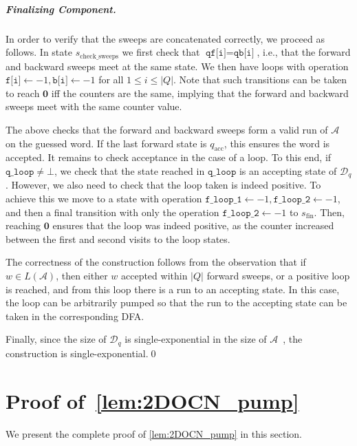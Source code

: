 \documentclass[11pt,a4paper]{amsart}
\theoremstyle{definition}
\newcommand{\accstate}{q_{\mathrm{acc}}}
\renewcommand{\vec}[1]{\boldsymbol{#1}}
\newcommand{\adds}[1]{\leftarrow #1}
\newcommand{\vf}[1]{\texttt{#1}}
\newcommand{\cA}{\mathcal{A}}
\newcommand{\cD}{\mathcal{D}}
\begin{document}
\subparagraph*{Finalizing Component.} In order to verify that the sweeps are
concatenated correctly, we proceed as follows. In state
$s_{\textrm{check\_sweeps}}$ we first check that $\vf{qf[i]}=\vf{qb[i]}$, i.e.,
that the forward and backward sweeps meet at the same state. We then have loops
with operation $\vf{f[i]}\adds{-1},\vf{b[i]}\adds{-1}$ for all $1\le i\le |Q|$. Note
that such transitions can be taken to reach $\vec{0}$ iff the counters are the
same, implying that the forward and backward sweeps meet with the same counter
value.

The above checks that the forward and backward sweeps form a valid run of $\cA$
on the guessed word. If the last forward state is $\accstate$, this ensures the
word is accepted. It remains to check acceptance in the case of a loop.  To this
end, if $\vf{q\_loop}\neq \bot$, we check that the state reached in $\vf{q\_loop}$ is
an accepting state of $\cD_q$. However, we also need to check that the loop
taken is indeed positive. To achieve this we move to a state with operation
$\vf{f\_loop\_1}\adds{-1},\vf{f\_loop\_2}\adds{-1}$, and then a final transition
with only the operation $\vf{f\_loop\_2}\adds{-1}$ to $s_{\textrm{fin}}$. Then,
reaching $\vec{0}$ ensures that the loop was indeed positive, as the counter
increased between the first and second visits to the loop states.

The correctness of the construction follows from the observation that if $w\in
L(\cA)$, then either $w$ accepted within $|Q|$ forward sweeps, or a positive
loop is reached, and from this loop there is a run to an accepting state. In
this case, the loop can be arbitrarily pumped so that the run to the accepting
state can be taken in the corresponding DFA.

Finally, since the size of $\cD_q$ is single-exponential in the size of
$\cA$~\cite{shepherdson1959reduction,rabin1959finite,vardi1989note}, the
construction is single-exponential.\hfill \qed




\section{Proof of~\cref{lem:2DOCN_pump}}
\label{apx:proofs_nondet_vs_det}
We present the complete proof of \cref{lem:2DOCN_pump} in this
section. 
\end{document}
